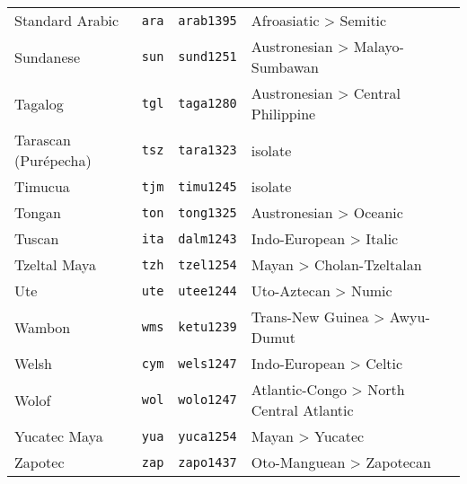 \begin{longtable}[c]{ l l l l l }
  Standard Arabic                  & \texttt{ara}       & \texttt{arab1395}   & Afroasiatic > Semitic\\
  Sundanese                        & \texttt{sun}       & \texttt{sund1251}   & Austronesian > Malayo-Sumbawan\\
  Tagalog                          & \texttt{tgl}       & \texttt{taga1280}   & Austronesian > Central Philippine\\
  Tarascan (Purépecha)             & \texttt{tsz}       & \texttt{tara1323}   & isolate\\
  Timucua                          & \texttt{tjm}       & \texttt{timu1245}   & isolate\\
  Tongan                           & \texttt{ton}       & \texttt{tong1325}   & Austronesian > Oceanic\\
  Tuscan                           & \texttt{ita}       & \texttt{dalm1243}   & Indo-European > Italic\\
  Tzeltal Maya                     & \texttt{tzh}       & \texttt{tzel1254}   & Mayan > Cholan-Tzeltalan\\
  Ute                              & \texttt{ute}       & \texttt{utee1244}   & Uto-Aztecan > Numic\\
  Wambon                           & \texttt{wms}       & \texttt{ketu1239}   & Trans-New Guinea > Awyu-Dumut\\
  Welsh                            & \texttt{cym}       & \texttt{wels1247}   & Indo-European > Celtic\\
  Wolof                            & \texttt{wol}       & \texttt{wolo1247}   & Atlantic-Congo > North Central Atlantic\\
  Yucatec Maya                     & \texttt{yua}       & \texttt{yuca1254}   & Mayan > Yucatec\\
  Zapotec                          & \texttt{zap}       & \texttt{zapo1437}   & Oto-Manguean > Zapotecan\\
\end{longtable}
